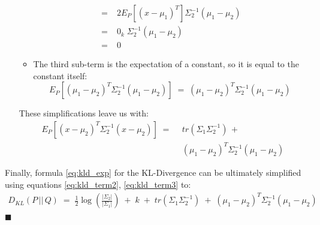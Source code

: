 \documentclass[12pt]{report}
\newcommand*{\QEDA}{\hfill\ensuremath{\blacksquare}}
\begin{document}
\begin{itemize}
\begin{itemize}
\begin{align*}
                    \;=&\; 2E_P \left[ (x - \mu_1)^T \right]
                        \Sigma_2^{-1}(\mu_1 - \mu_2) \\
                    \;=&\; 0_k \; \Sigma_2^{-1}(\mu_1 - \mu_2) \\
                    \;=&\; 0
                \end{align*}
            \item The third sub-term is the expectation of a constant, so it is equal
                to the constant itself:
                $$E_P \left[ (\mu_1 - \mu_2)^T\Sigma_2^{-1}(\mu_1 - \mu_2)\right] \;=\;
                (\mu_1 - \mu_2)^T\Sigma_2^{-1}(\mu_1 - \mu_2)$$
        \end{itemize}
    These simplifications leave us with:
    \begin{align}\label{eq:kld_term3}
        E_P \left[ (x - \mu_2)^T\Sigma_2^{-1} (x - \mu_2) \right] \;=\;\,
        &tr(\Sigma_1\Sigma_2^{-1}) \,+ \nonumber \\
        &(\mu_1 - \mu_2)^T\Sigma_2^{-1}(\mu_1 - \mu_2)
    \end{align}
\end{itemize}

\noindent Finally, formula \eqref{eq:kld_exp} for the KL-Divergence can be ultimately
simplified using equations \eqref{eq:kld_term2}, \eqref{eq:kld_term3} to:
\begin{align}
    D_{KL} (P \,||\, Q) \;=\;
    \frac{1}{2}\log\left(\frac{|\Sigma_2|}{|\Sigma_1|}\right) \;+\;
    k \;+\;
    tr(\Sigma_1\Sigma_2^{-1}) \;+\; (\mu_1 - \mu_2)^T\Sigma_2^{-1}(\mu_1 - \mu_2)
\end{align}
\QEDA
\end{document}
